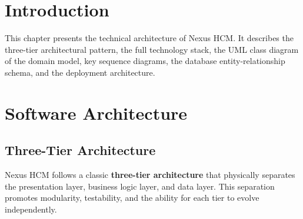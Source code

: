 \documentclass[12pt,a4paper]{report}
\begin{document}
\section{Introduction}

This chapter presents the technical architecture of Nexus HCM. It describes the
three-tier architectural pattern, the full technology stack, the UML class diagram
of the domain model, key sequence diagrams, the database entity-relationship schema,
and the deployment architecture.

\section{Software Architecture}

\subsection{Three-Tier Architecture}

Nexus HCM follows a classic \textbf{three-tier architecture} that physically separates
the presentation layer, business logic layer, and data layer. This separation promotes
modularity, testability, and the ability for each tier to evolve independently.
\end{document}
